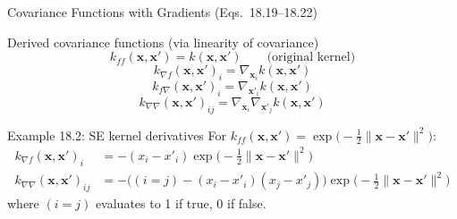 \documentclass[aspectratio=169,10pt]{beamer}
\newcommand{\bx}{\mathbf{x}}
\begin{document}
\begin{frame}{Covariance Functions with Gradients (Eqs.\ 18.19--18.22)}
  \begin{block}{Derived covariance functions (via linearity of covariance)}
    \[
      k_{ff}(\bx,\bx') = k(\bx,\bx') \qquad\text{(original kernel)}
    \]
    \[
      k_{\nabla f}(\bx,\bx')_i = \nabla_{\bx_i} k(\bx,\bx')
    \]
    \[
      k_{f\nabla}(\bx,\bx')_i = \nabla_{\bx'_i} k(\bx,\bx')
    \]
    \[
      k_{\nabla\nabla}(\bx,\bx')_{ij} = \nabla_{\bx_i}\nabla_{\bx'_j} k(\bx,\bx')
    \]
  \end{block}
  \vspace{0.3em}
  \begin{block}{Example 18.2: SE kernel derivatives}
    For $k_{ff}(\bx,\bx') = \exp\bigl(-\tfrac{1}{2}\|\bx-\bx'\|^2\bigr)$:
    \begin{align*}
      k_{\nabla f}(\bx,\bx')_i &= -(x_i - x'_i)\exp\bigl(-\tfrac{1}{2}\|\bx-\bx'\|^2\bigr)\\
      k_{\nabla\nabla}(\bx,\bx')_{ij} &= -\bigl((i=j) - (x_i-x'_i)(x_j-x'_j)\bigr)
                                          \exp\bigl(-\tfrac{1}{2}\|\bx-\bx'\|^2\bigr)
    \end{align*}
    where $(i=j)$ evaluates to 1 if true, 0 if false.
  \end{block}
\end{frame}
\end{document}
